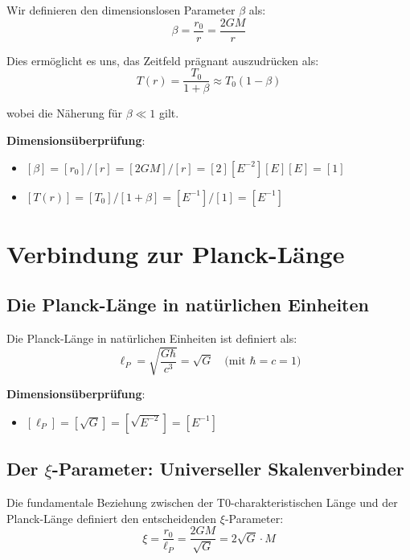 \documentclass[12pt,a4paper]{article}
\begin{document}
Wir definieren den dimensionslosen Parameter $\beta$ als:
\begin{equation}
	\boxed{\beta = \frac{r_0}{r} = \frac{2GM}{r}}
\end{equation}

Dies ermöglicht es uns, das Zeitfeld prägnant auszudrücken als:
\begin{equation}
	T(r) = \frac{T_0}{1 + \beta} \approx T_0(1 - \beta)
\end{equation}

wobei die Näherung für $\beta \ll 1$ gilt.

\textbf{Dimensionsüberprüfung}:
\begin{itemize}
	\item $[\beta] = [r_0]/[r] = [2GM]/[r] = [2][E^{-2}][E][E] = [1]$ \checkmark
	\item $[T(r)] = [T_0]/[1 + \beta] = [E^{-1}]/[1] = [E^{-1}]$ \checkmark
\end{itemize}

\section{Verbindung zur Planck-Länge}
\label{sec:planck_length_connection}

\subsection{Die Planck-Länge in natürlichen Einheiten}
\label{subsec:planck_length_natural}

Die Planck-Länge in natürlichen Einheiten ist definiert als:
\begin{equation}
	\ell_P = \sqrt{\frac{G\hbar}{c^3}} = \sqrt{G} \quad \text{(mit } \hbar = c = 1\text{)}
\end{equation}

\textbf{Dimensionsüberprüfung}:
\begin{itemize}
	\item $[\ell_P] = [\sqrt{G}] = [\sqrt{E^{-2}}] = [E^{-1}]$ \checkmark
\end{itemize}

\subsection{Der $\xi$-Parameter: Universeller Skalenverbinder}
\label{subsec:xi_universal_connector}

Die fundamentale Beziehung zwischen der T0-charakteristischen Länge und der Planck-Länge definiert den entscheidenden $\xi$-Parameter:
\begin{equation}
	\boxed{\xi = \frac{r_0}{\ell_P} = \frac{2GM}{\sqrt{G}} = 2\sqrt{G} \cdot M}
\end{equation}
\end{document}

